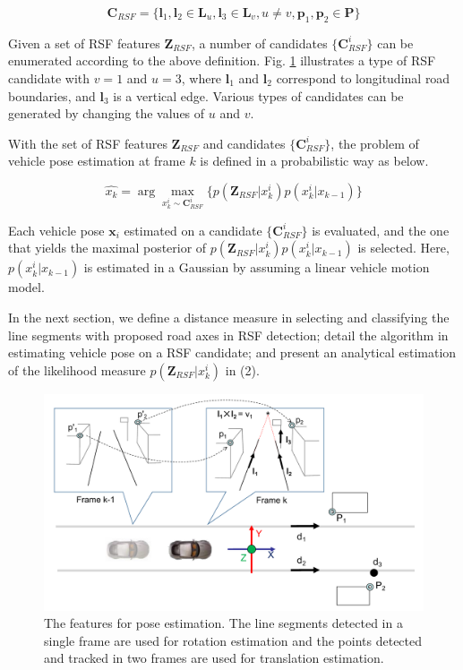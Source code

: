 \documentclass[letterpaper, 10 pt, conference]{ieeeconf}  %
\begin{document}
\begin{equation}
\mathbf{C}_{RSF}=\{\mathbf{l}_1,\mathbf{l}_2\in \mathbf{L}_u, \mathbf{l}_3\in \mathbf{L}_v, u \neq v, \mathbf{p}_1,\mathbf{p}_2\in \mathbf{P}\}
\label{eq:C_RSF}
\end{equation}

Given a set of RSF features $\mathbf{Z}_{RSF}$, a number of candidates $\{\mathbf{C}_{RSF}^i\}$ can be enumerated according to the above definition. Fig. \ref{fig:features_for_estimation} illustrates a type of RSF candidate with $v=1$ and $u=3$, where $\mathbf{l}_1$ and $\mathbf{l}_2$ correspond to longitudinal road boundaries, and $\mathbf{l}_3$ is a vertical edge. Various types of candidates can be generated by changing the values of $u$ and $v$.

With the set of RSF features $\mathbf{Z}_{RSF}$ and candidates $\{\mathbf{C}_{RSF}^i\}$, the problem of vehicle pose estimation at frame $k$ is defined in a probabilistic way as below.

\begin{equation}
\hat{x_k} = \displaystyle \arg\max _{x_k^i \sim \mathbf{C}_{RSF}^i} \{ p(\mathbf{Z}_{RSF} | x_k^i) p(x_k^i|x_{k-1}) \}
\end{equation}

Each vehicle pose $\mathbf{x}_i$ estimated on a candidate $\{\mathbf{C}_{RSF}^i\}$ is evaluated, and the one that yields the maximal posterior of $p(\mathbf{Z}_{RSF} | x_k^i) p(x_k^i|x_{k-1})$ is selected. Here, $p(x_k^i|x_{k-1})$ is estimated in a Gaussian by assuming a linear vehicle motion model.

In the next section, we define a distance measure in selecting and classifying the line segments with proposed road axes in RSF detection; detail the algorithm in estimating vehicle pose on a RSF candidate; and present an analytical estimation of the likelihood measure $p(\mathbf{Z}_{RSF} | x_k^i)$ in (2).



\begin{figure}
  \centering
  \includegraphics[width=0.9\linewidth]{source//Final//feature.pdf}
  \caption{The features for pose estimation. The line segments detected in a single frame are used for rotation estimation and the points detected and tracked in two frames are used for translation estimation.}
  \label{fig:features_for_estimation}
\end{figure}
\end{document}
